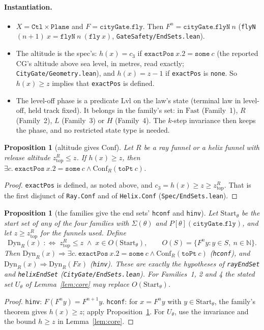 \documentclass[11pt]{article}
\newtheorem{proposition}[theorem]{Proposition}
\theoremstyle{definition}
\newcommand{\N}{\mathbb{N}}
\newcommand{\Conf}{\ensuremath{\mathrm{Conf}}}
\newcommand{\Dyn}{\ensuremath{\mathrm{Dyn}}}
\newcommand{\Fast}{\ensuremath{\mathrm{Fast}}}
\newcommand{\Start}{\ensuremath{\mathrm{Start}}}
\newcommand{\zTop}{z_{\mathrm{top}}}
\begin{document}
\paragraph{Instantiation.}
\begin{itemize}
\item $X = \texttt{Ctl} \times \texttt{Plane}$ and $F = \texttt{cityGate.fly}$. Then $F^n = \texttt{cityGate.flyN}\ n$ (\texttt{flyN}~$(n{+}1)\ x = \texttt{flyN}\ n\ (\texttt{fly}\ x)$, \texttt{GateSafety/EndSets.lean}).
\item The altitude is the spec's: $h(x) = c_3$ if $\texttt{exactPos}\ x.2 = \texttt{some}\ c$ (the reported CG's altitude above sea level, in metres, read exactly; \texttt{CityGate/Geometry.lean}), and $h(x) = z - 1$ if \texttt{exactPos} is \texttt{none}. So $h(x) \ge z$ implies that \texttt{exactPos} is defined.
\item The level-off phase is a predicate $\mathrm{Lvl}$ on the law's state (terminal law in level-off, held track fixed). It belongs in the family's set: in $\Fast$ (Family~1), $R$ (Family~2), $L$ (Family~3) or $H$ (Family~4). The $k$-step invariance then keeps the phase, and no restricted state type is needed.
\end{itemize}

\begin{proposition}[altitude gives \Conf]\label{prop:conf}
Let $R$ be a ray funnel or a helix funnel with release altitude $\zTop^R \le z$. If $h(x) \ge z$, then $\exists c.\ \texttt{exactPos}\ x.2 = \texttt{some}\ c \wedge \Conf_R(\texttt{toPt}\ c)$.
\end{proposition}
\begin{proof}
\texttt{exactPos} is defined, as noted above, and $c_3 = h(x) \ge z \ge \zTop^R$. That is the first disjunct of \texttt{Ray.Conf} and of \texttt{Helix.Conf} (\texttt{Spec/EndSets.lean}).
\end{proof}

\begin{proposition}[the families give the end sets' \texttt{hconf} and \texttt{hinv}]\label{prop:endset}
Let $\Start_\theta$ be the start set of any of the four families with $\Sigma(\theta)$ and $P[\theta](\texttt{cityGate.fly})$, and let $z \ge \zTop^R$ for the funnels used. Define
\[ \Dyn_R(x) \;:\iff\; \zTop^R \le z \;\wedge\; x \in O(\Start_\theta), \qquad O(S) = \{F^n y : y \in S,\ n \in \N\}. \]
Then $\Dyn_R(x) \Rightarrow \exists c.\ \texttt{exactPos}\ x.2 = \texttt{some}\ c \wedge \Conf_R(\texttt{toPt}\ c)$ (\texttt{hconf}), and $\Dyn_R(x) \Rightarrow \Dyn_R(F x)$ (\texttt{hinv}). These are exactly the hypotheses of \texttt{rayEndSet} and \texttt{helixEndSet} (\texttt{CityGate/EndSets.lean}). For Families~1, 2 and 4 the stated set $U_\theta$ of Lemma~\ref{lem:core} may replace $O(\Start_\theta)$.
\end{proposition}
\begin{proof}
\texttt{hinv}: $F(F^n y) = F^{n+1} y$. \texttt{hconf}: for $x = F^n y$ with $y \in \Start_\theta$, the family's theorem gives $h(x) \ge z$; apply Proposition~\ref{prop:conf}. For $U_\theta$, use the invariance and the bound $h \ge z$ in Lemma~\ref{lem:core}.
\end{proof}
\end{document}
